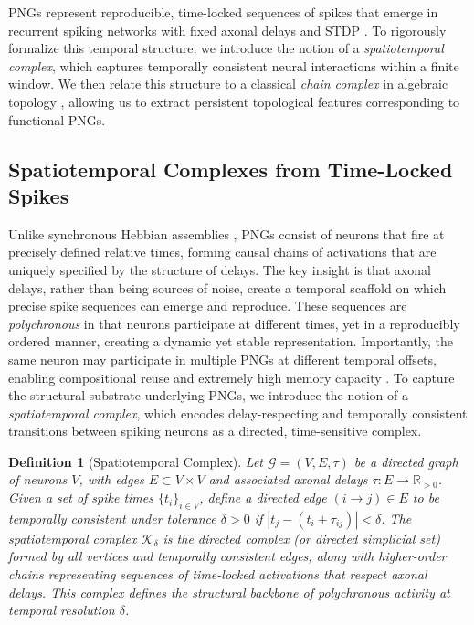 \documentclass[lettersize,journal]{IEEEtran}
\newtheorem{definition}{Definition}
\begin{document}
PNGs represent reproducible, time-locked sequences of spikes that emerge in recurrent spiking networks with fixed axonal delays and STDP \cite{caporale2008spike}. To rigorously formalize this temporal structure, we introduce the notion of a \emph{spatiotemporal complex}, which captures temporally consistent neural interactions within a finite window. We then relate this structure to a classical \emph{chain complex} in algebraic topology \cite{hatcher2005algebraic}, allowing us to extract persistent topological features corresponding to functional PNGs.

\subsection{Spatiotemporal Complexes from Time-Locked Spikes}

Unlike synchronous Hebbian assemblies \cite{hebb1949organization}, PNGs consist of neurons that fire at precisely defined relative times, forming causal chains of activations that are uniquely specified by the structure of delays. The key insight is that axonal delays, rather than being sources of noise, create a temporal scaffold on which precise spike sequences can emerge and reproduce. These sequences are \emph{polychronous} in that neurons participate at different times, yet in a reproducibly ordered manner, creating a dynamic yet stable representation. Importantly, the same neuron may participate in multiple PNGs at different temporal offsets, enabling compositional reuse and extremely high memory capacity \cite{izhikevich2006polychronization}. 
To capture the structural substrate underlying PNGs, we introduce the notion of a \emph{spatiotemporal complex}, which encodes delay-respecting and temporally consistent transitions between spiking neurons as a directed, time-sensitive complex.

\begin{definition}[Spatiotemporal Complex]
Let \( \mathcal{G} = (V, E, \tau) \) be a directed graph of neurons \( V \), with edges \( E \subset V \times V \) and associated axonal delays \( \tau : E \rightarrow \mathbb{R}_{> 0} \). Given a set of spike times \( \{t_i\}_{i \in V} \), define a directed edge \( (i \to j) \in E \) to be \emph{temporally consistent} under tolerance \( \delta > 0 \) if
$|t_j - (t_i + \tau_{ij})| < \delta$.
The \emph{spatiotemporal complex} \( \mathcal{K}_\delta \) is the directed complex (or directed simplicial set) formed by all vertices and temporally consistent edges, along with higher-order chains representing sequences of time-locked activations that respect axonal delays. This complex defines the structural backbone of polychronous activity at temporal resolution \( \delta \).
\end{definition}
\end{document}

